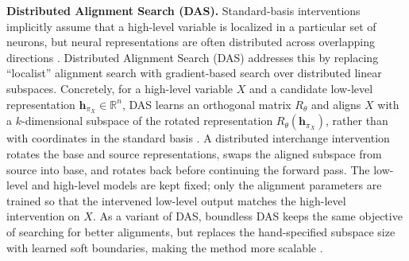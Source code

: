 \textbf{Distributed Alignment Search (DAS).} Standard-basis interventions implicitly assume that a high-level variable is localized in a particular set of neurons, but neural representations are often distributed across overlapping directions \citep{smolensky1986neural,olah2020zoom,Scherlis2022,geiger-etal-2023-DAS}. Distributed Alignment Search (DAS) addresses this by replacing ``localist'' alignment search with gradient-based search over distributed linear subspaces. Concretely, for a high-level variable \(X\) and a candidate low-level representation \(\mathbf h_{\pi_X}\in\mathbb R^n\), DAS learns an orthogonal matrix \(R_\theta\) and aligns \(X\) with a \(k\)-dimensional subspace of the rotated representation \(R_\theta(\mathbf h_{\pi_X})\), rather than with coordinates in the standard basis \citep{geiger-etal-2023-DAS}. A distributed interchange intervention rotates the base and source representations, swaps the aligned subspace from source into base, and rotates back before continuing the forward pass. The low-level and high-level models are kept fixed; only the alignment parameters are trained so that the intervened low-level output matches the high-level intervention on \(X\). As a variant of DAS, boundless DAS keeps the same objective of searching for better alignments, but replaces the hand-specified subspace size with learned soft boundaries, making the method more scalable \citep{wu-etal-2023-Boundless-DAS}.



